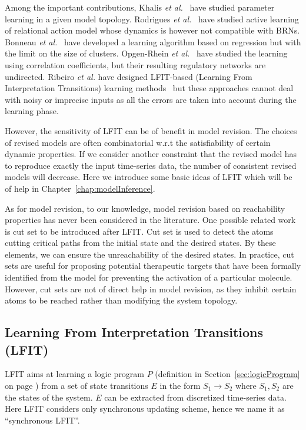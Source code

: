 Among the important contributions, Khalis \textit{et al.}~\cite{khalis2009smbionet} have studied parameter learning in a given model topology.
Rodrigues \textit{et al.}~\cite{rodrigues2011active} have studied active learning of relational action model whose dynamics is however not compatible with BRNs.
Bonneau \textit{et al.}~\cite{bonneau2006inferelator} have developed a learning algorithm based on regression but with the limit on the size of clusters.
Opgen-Rhein \textit{et al.}~\cite{opgen2007correlation} have studied the learning using correlation coefficients, but their resulting regulatory networks are undirected. 
Ribeiro \textit{et al.} have designed LFIT-based (Learning From Interpretation Transitions) learning methods~\cite{ribeiro2015learning,ribeiro2018learning,ribeiro2017inductive} but these approaches cannot deal with noisy or imprecise inputs as all the errors are taken into account during the learning phase.

However, the sensitivity of LFIT can be of benefit in model revision.
The choices of revised models are often combinatorial w.r.t the satisfiability of certain dynamic properties.
If we consider another constraint that the revised model has to reproduce exactly the input time-series data, the number of consistent revised models will decrease.
Here we introduce some basic ideas of LFIT which will be of help in Chapter~\ref{chap:modelInference}.

As for model revision, to our knowledge, model revision based on reachability properties has never been considered in the literature.
One possible related work is cut set to be introduced after LFIT.
Cut set is used to detect the atoms cutting critical paths from the initial state and the desired states.
By  these elements, we can ensure the unreachability of the desired states.
In practice, cut sets are useful for proposing potential therapeutic targets that have been formally identified from the model for preventing the activation of a particular molecule.
However, cut sets are not of direct help in model revision, as they inhibit certain atoms to be reached rather than modifying the system topology.

\subsection{Learning From Interpretation Transitions (LFIT)}\label{sec:lfitSyn}
LFIT  aims at learning a logic program $P$ (definition in Section~\ref{sec:logicProgram} on page \pageref{sec:logicProgram}) from a set of state transitions $E$ in the form $S_1\to S_2$ where $S_1,S_2$ are the states of the system.
$E$ can be extracted from discretized time-series data.
Here LFIT considers only synchronous updating scheme, hence we name it as ``synchronous LFIT''.

